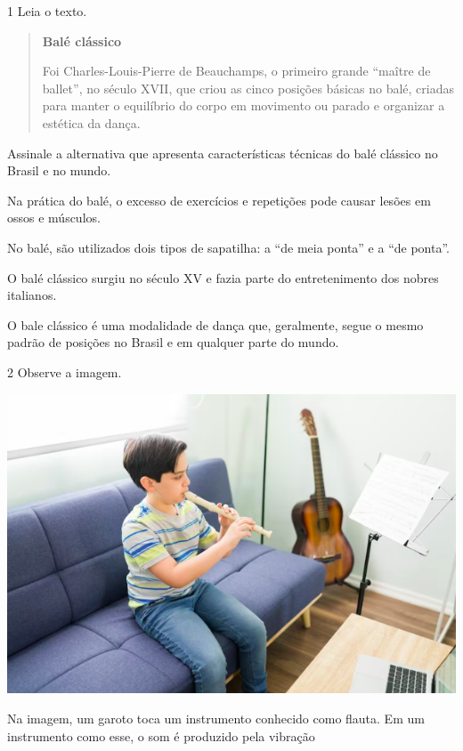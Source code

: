 \pagebreak


\num{1} Leia o texto.

\begin{quote}
\textbf{Balé clássico}

Foi Charles-Louis-Pierre de Beauchamps, o primeiro grande ``maître de ballet'', no século XVII, que criou as cinco posições básicas no balé, criadas para manter o equilíbrio do corpo em movimento ou parado e organizar a estética da dança.

\end{quote}

Assinale a alternativa que apresenta características técnicas do balé
clássico no Brasil e no mundo.

\begin{escolha}
\item
  Na prática do balé, o excesso de exercícios e repetições pode causar
  lesões em ossos e músculos.
\item
  No balé, são utilizados dois tipos de sapatilha: a “de meia ponta” e
  a “de ponta”.
\item
  O balé clássico surgiu no século XV e fazia parte do entretenimento
  dos nobres italianos.
\item
  O bale clássico é uma modalidade de dança que, geralmente, segue o
  mesmo padrão de posições no Brasil e em qualquer parte do mundo.
\end{escolha}


\num{2} Observe a imagem.

\begin{minipage}{.5\textwidth}
\includegraphics[width=\textwidth]{./imgs/art41.png}
\end{minipage}\hspace{.5cm}
\begin{minipage}{.5\textwidth}
Na imagem, um garoto toca um instrumento conhecido como flauta. Em um instrumento como esse, o som é produzido pela vibração
\end{minipage}

